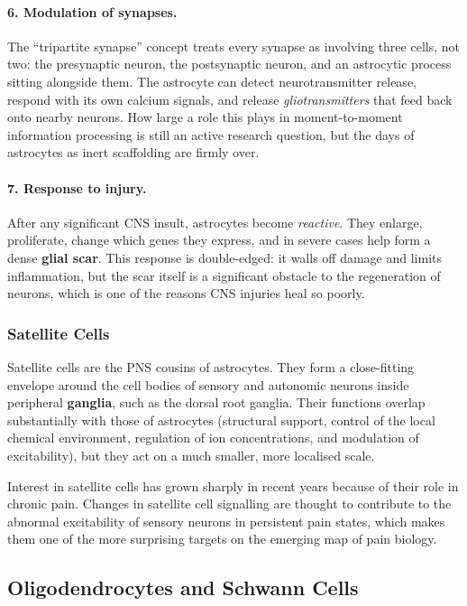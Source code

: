 \documentclass[11pt]{article}
\begin{document}
\paragraph{6. Modulation of synapses.} The ``tripartite synapse'' concept treats every synapse as involving three cells, not two: the presynaptic neuron, the postsynaptic neuron, and an astrocytic process sitting alongside them. The astrocyte can detect neurotransmitter release, respond with its own calcium signals, and release \textit{gliotransmitters} that feed back onto nearby neurons. How large a role this plays in moment-to-moment information processing is still an active research question, but the days of astrocytes as inert scaffolding are firmly over.

\paragraph{7. Response to injury.} After any significant CNS insult, astrocytes become \textit{reactive}. They enlarge, proliferate, change which genes they express, and in severe cases help form a dense \textbf{glial scar}. This response is double-edged: it walls off damage and limits inflammation, but the scar itself is a significant obstacle to the regeneration of neurons, which is one of the reasons CNS injuries heal so poorly.

\subsubsection{Satellite Cells}

Satellite cells are the PNS cousins of astrocytes. They form a close-fitting envelope around the cell bodies of sensory and autonomic neurons inside peripheral \textbf{ganglia}, such as the dorsal root ganglia. Their functions overlap substantially with those of astrocytes (structural support, control of the local chemical environment, regulation of ion concentrations, and modulation of excitability), but they act on a much smaller, more localised scale.

Interest in satellite cells has grown sharply in recent years because of their role in chronic pain. Changes in satellite cell signalling are thought to contribute to the abnormal excitability of sensory neurons in persistent pain states, which makes them one of the more surprising targets on the emerging map of pain biology.

\subsection{Oligodendrocytes and Schwann Cells}
\end{document}
